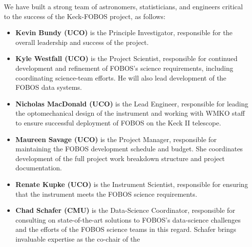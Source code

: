 \documentclass[oneside,11pt]{amsart}
\begin{document}


\begin{center}
\end{center}

\smallskip

\noindent We have built a strong team of astronomers, statisticians, and
engineers critical to the success of the Keck-FOBOS project, as follows:
%
\begin{itemize}
%
\item {\bf Kevin Bundy (UCO)} is the Principle Investigator, responsible
for the overall leadership and success of the project.\\[-5pt]
%
\item {\bf Kyle Westfall (UCO)} is the Project Scientist, responsible
for continued development and refinement of FOBOS's science
requirements, including coordinating science-team efforts.  He will also
lead development of the FOBOS data systems.\\[-5pt]
%
\item {\bf Nicholas MacDonald (UCO)} is the Lead Engineer, responsible
for leading the optomechanical design of the instrument and working with
WMKO staff to ensure successful deployment of FOBOS on the Keck II
telescope.\\[-5pt]
%
\item {\bf Maureen Savage (UCO)} is the Project Manager, responsible for
maintaining the FOBOS development schedule and budget.  She coordinates
development of the full project work breakdown structure and project
documentation.\\[-5pt]
%
\item {\bf Renate Kupke (UCO)} is the Instrument Scientist, responsible
for ensuring that the instrument meets the FOBOS science
requirements.\\[-5pt]
%
\item {\bf Chad Schafer (CMU)} is the Data-Science Coordinator,
responsible for consulting on state-of-the-art solutions to FOBOS’s
data-science challenges and the efforts of the FOBOS science teams in
this regard. Schafer brings invaluable expertise as the co-chair of the

\end{itemize}
\end{document}
